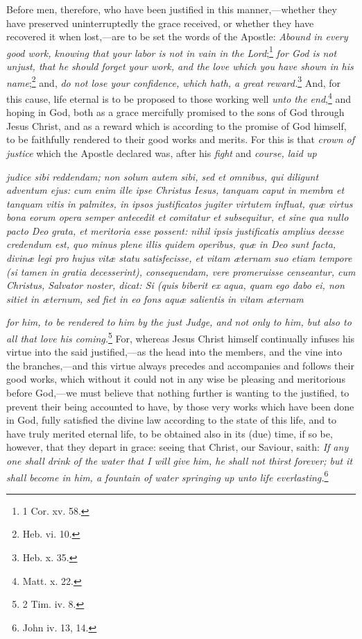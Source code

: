 Before men, therefore, who have been justified in this manner,—whether they have preserved uninterruptedly the grace received, or whether they have recovered it when lost,—are to be set the words of the Apostle: \emph{Abound in every good work, knowing that your labor is not in vain in the Lord};\footnote{\par   1 Cor. xv. 58.} \emph{for God is not unjust, that he should forget your work, and the love which you have shown in his name};\footnote{\par   Heb. vi. 10.} and, \emph{do not lose your confidence, which hath, a great reward.}\footnote{\par   Heb. x. 35.} And, for this cause, life eternal is to be proposed to those working well \emph{unto the end},\footnote{\par   Matt. x. 22.} and hoping in God, both as a grace mercifully promised to the sons of God through Jesus Christ, and as a reward which is according to the promise of God himself, to be faithfully rendered to their good works and merits. For this is that \emph{crown of justice} which the Apostle declared was, after his \emph{fight} and \emph{course, laid up}

\emph{judice sibi reddendam; non solum autem sibi, sed et omnibus, qui diligunt adventum ejus: cum enim ille ipse Christus Iesus, tanquam caput in membra et tanquam vitis in palmites, in ipsos justificatos jugiter virtutem influat, quæ virtus bona eorum opera semper antecedit et comitatur et subsequitur, et sine qua nullo pacto Deo grata, et meritoria esse possent: nihil ipsis justificatis amplius deesse credendum est, quo minus plene illis quidem operibus, quæ in Deo sunt facta, divinæ legi pro hujus vitæ statu satisfecisse, et vitam æternam suo etiam tempore (si tamen in gratia decesserint), consequendam, vere promeruisse censeantur, cum Christus, Salvator noster, dicat: Si (quis biberit ex aqua, quam ego dabo ei, non sitiet in æternum, sed fiet in eo fons aquæ salientis in vitam æternam }

\emph{for him, to be rendered to him by the just Judge, and not only to him, but also to all that love his coming.}\footnote{\par   2 Tim. iv. 8.} For, whereas Jesus Christ himself continually infuses his virtue into the said justified,—as the head into the members, and the vine into the branches,—and this virtue always precedes and accompanies and follows their good works, which without it could not in any wise be pleasing and meritorious before God,—we must believe that nothing further is wanting to the justified, to prevent their being accounted to have, by those very works which have been done in God, fully satisfied the divine law according to the state of this life, and to have truly merited eternal life, to be obtained also in its (due) time, if so be, however, that they depart in grace: seeing that Christ, our Saviour, saith: \emph{If any one shall drink of the water that I will give him, he shall not thirst forever; but it shall become in him, a fountain of water springing up unto life everlasting.}\footnote{\par   John iv. 13, 14.}

